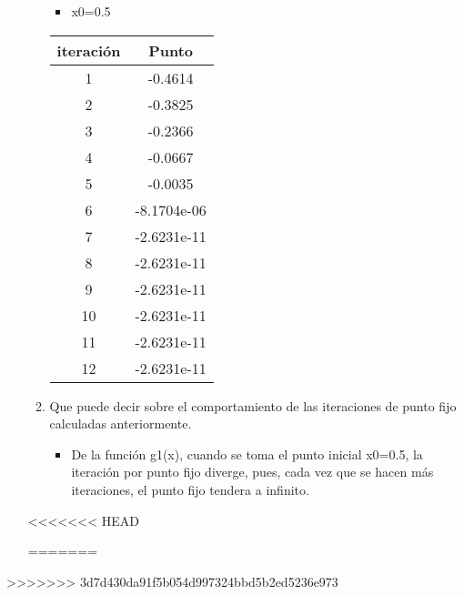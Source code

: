 \documentclass{udparticle}
\begin{document}
\begin{enumerate}
\begin{enumerate}
\begin{table}[H]
\begin{tabular} { |c|c|}
        
        \end{tabular}
        
    \end{table}
     \begin{itemize}
\item x0=0.5
\end{itemize}

\begin{table}[H]
    \centering
        \begin{tabular} { |c|c|}
        
        \hline
        iteración  &  Punto\\
        \hline
        1 &  -0.4614      \\
         \hline
        2 &   -0.3825   \\
         \hline
        3 &  -0.2366 \\
         \hline
        4 &  -0.0667    \\
         \hline
        5 &   -0.0035 \\
         \hline
        6 & -8.1704e-06     \\
         \hline
        7 &     -2.6231e-11 \\
         \hline
        8 &   -2.6231e-11   \\
         \hline
        9 &        -2.6231e-11 \\
         \hline
        10 &     -2.6231e-11    \\
         \hline
        11 &    -2.6231e-11 \\
         \hline
        12 &    -2.6231e-11  \\
        
        
        \end{tabular}
        
    \end{table}
\vspace{3cm}
\item Que puede decir sobre el comportamiento de las iteraciones de punto fijo calculadas anteriormente.
\begin{itemize}

\item De la función g1(x), cuando se toma el punto inicial x0=0.5, la iteración por punto fijo diverge, pues, cada vez que se hacen más iteraciones, el punto fijo tendera a infinito. 
\end{itemize}
\end{enumerate}
<<<<<<< HEAD

=======
\end{enumerate}
>>>>>>> 3d7d430da91f5b054d997324bbd5b2ed5236e973
\end{document}
